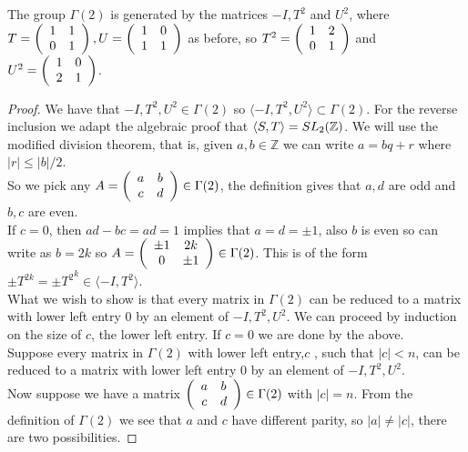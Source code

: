 \begin{theorem} \label{thm:-IT2U2genGamma2}
The group $\Gamma(2)$ is generated by the matrices $-I,T^2$ and $U^2$, where $T = \left(\begin{array}{ c c } 1 & 1 \\ 0 & 1 \end{array} \right),U = \left(\begin{array}{ c c } 1 & 0 \\ 1 & 1 \end{array} \right)$ as before, so $T^2 = \left(\begin{array}{ c c } 1 & 2 \\ 0 & 1 \end{array} \right)$ and $U^2 = \left(\begin{array}{ c c } 1 & 0 \\ 2 & 1 \end{array} \right)$. 
\end{theorem}
\begin{proof}
We have that $-I,T^2,U^2 \in \Gamma(2)$  so $\langle -I,T^2,U^2 \rangle \subset \Gamma(2)$. For the reverse inclusion we adapt the algebraic proof that $\langle S,T\rangle = SL_2(\mathbb{Z})$. We will use the modified division theorem, that is, given $a,b \in \mathbb{Z}$ we can write $a = bq + r$ where $ |r| \leq |b|/2$.\\
So we pick any $A  =  \left(\begin{array}{ c c } a & b \\ c & d \end{array} \right) \in \Gamma(2)$, the definition gives that $a,d$ are odd and $b,c$ are even. \\
If $c=0$, then $ad-bc = ad = 1$ implies that $a=d = \pm 1$, also $b$ is even so can write as $b = 2k$ so $A =  \left(\begin{array}{ c c } \pm 1 & 2k \\ 0 & \pm 1 \end{array} \right) \in \Gamma(2)$. This is of the form $ \pm T^{2k} = \pm {T^2}^k \in \langle -I, T^2 \rangle$.\\
What we wish to show is that every matrix in $\Gamma(2)$ can be reduced to a matrix with lower left entry 0 by an element of $-I,T^2,U^2$.
We can proceed by induction on the size of $c$, the lower left entry. If $c=0$ we are done by the above.\\
Suppose every matrix in $\Gamma(2)$ with lower left entry,$c$ , such that $|c| < n$, can be reduced to a matrix with lower left entry 0 by an element of $-I,T^2,U^2$. \\
Now suppose we have a matrix $\left(\begin{array}{ c c } a & b \\ c & d \end{array} \right) \in \Gamma(2) $ with $ |c| = n$. From the definition of $\Gamma(2)$ we see that $a$ and $c$ have different parity, so $|a| \neq |c|$, there are two possibilities.

\end{proof}
